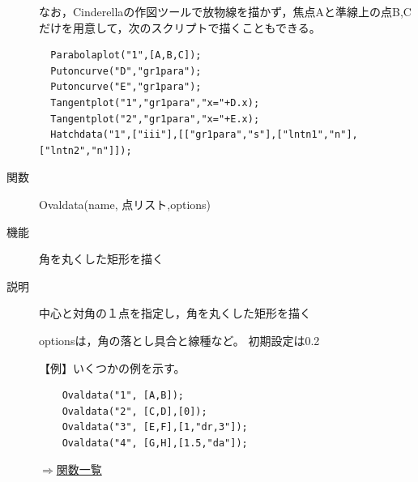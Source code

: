 \documentclass[papersize,a4paper,12pt,uplatex]{jsarticle}
\begin{document}
\begin{description}
なお，Cinderellaの作図ツールで放物線を描かず，焦点Aと準線上の点B,Cだけを用意して，次のスクリプトで描くこともできる。
\begin{verbatim}
  Parabolaplot("1",[A,B,C]);
  Putoncurve("D","gr1para");
  Putoncurve("E","gr1para");
  Tangentplot("1","gr1para","x="+D.x);
  Tangentplot("2","gr1para","x="+E.x);
  Hatchdata("1",["iii"],[["gr1para","s"],["lntn1","n"],["lntn2","n"]]);
 \end{verbatim}
 

\vspace{\baselineskip}
\hypertarget{ovaldata}{}
\item[関数]  Ovaldata(name, 点リスト,options)
\item[機能]  角を丸くした矩形を描く
\item[説明]  中心と対角の１点を指定し，角を丸くした矩形を描く

optionsは，角の落とし具合と線種など。 初期設定は0.2 

\vspace{\baselineskip}
【例】いくつかの例を示す。
\begin{verbatim}
    Ovaldata("1", [A,B]);
    Ovaldata("2", [C,D],[0]);
    Ovaldata("3", [E,F],[1,"dr,3"]);
    Ovaldata("4", [G,H],[1.5,"da"]);
\end{verbatim}
\begin{center} \end{center}

\begin{flushright}  \hyperlink{functionlist}{$\Rightarrow$関数一覧}\end{flushright}
\end{description}
\end{document}
